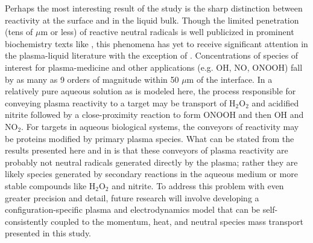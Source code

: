 Perhaps the most interesting result of the study is the sharp distinction between reactivity at the surface and in the liquid bulk. Though the limited penetration (tens of $\mu$m or less) of reactive neutral radicals is well publicized in prominent biochemistry texts like \cite{Halliwell}, this phenomena has yet to receive significant attention in the plasma-liquid literature with the exception of \cite{Chen2014a}. Concentrations of species of interest for plasma-medicine and other applications (e.g. OH, NO, ONOOH) fall by as many as 9 orders of magnitude within 50 $\mu$m of the interface. In a relatively pure aqueous solution as is modeled here, the process responsible for conveying plasma reactivity to a target may be transport of H$_2$O$_2$ and acidified nitrite followed by a close-proximity reaction to form ONOOH and then OH and NO$_2$. For targets in aqueous biological systems, the conveyors of reactivity may be proteins modified by primary plasma species. What can be stated from the results presented here and in \cite{Chen2014a} is that these conveyors of plasma reactivity are probably not neutral radicals generated directly by the plasma; rather they are likely species generated by secondary reactions in the aqueous medium or more stable compounds like H$_2$O$_2$ and nitrite. To address this problem with even greater precision and detail, future research will involve developing a configuration-specific plasma and electrodynamics model that can be self-consistently coupled to the momentum, heat, and neutral species mass transport presented in this study.
